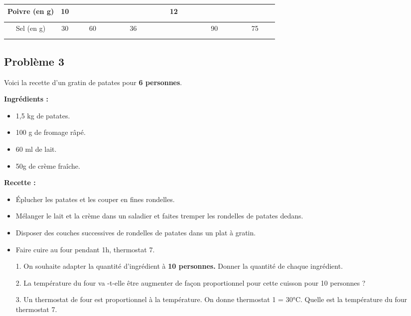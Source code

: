 \begin{center}\begin{tabular}{|c|c|c|c|c|c|c|} \hline
  Poivre (en g) & 10 &  $\phantom{\dfrac{azertyuiop}{O}}$  &   $\phantom{\dfrac{azertyuiop}{O}}$ & 12 &  $\phantom{\dfrac{azertyuiop}{O}}$  &  $\phantom{\dfrac{azertyuiop}{O}}$  \\  \hline
  Sel (en g)    & 30 & 60 & 36 &  $\phantom{\dfrac{azertyuiop}{O}}$  & 90 & 75 \\  \hline
\end{tabular}\end{center}

\Pointilles[5] 

\subsection*{Problème 3}

Voici la recette d'un gratin de patates pour \textbf{6 personnes}. 

\begin{minipage}[t]{0.45\textwidth}
  \textbf{Ingrédients : }
  \begin{itemize}
    \item 1,5 kg de patates.
    \item 100 g de fromage râpé.
    \item 60 ml de lait.
    \item 50g de crème fraîche.
  \end{itemize}

\end{minipage}
\begin{minipage}[t]{0.5\textwidth}
  \textbf{Recette :}
  \begin{itemize}
    \item Éplucher les patates et les couper en fines rondelles.
    \item Mélanger le lait et la crème dans un saladier et faites tremper les rondelles de patates dedans.
    \item Disposer des couches successives de rondelles de patates dans un plat à gratin. 
    \item Faire cuire au four pendant 1h, thermostat 7.
  \end{itemize}
\end{minipage}

\begin{enumerate}
  \item[1.] On souhaite adapter la quantité d'ingrédient à \textbf{10 personnes.} Donner la quantité de chaque ingrédient. \\ \Pointilles[7] 
  \item[2.] La température du four va -t-elle être augmenter de façon proportionnel pour cette cuisson pour 10 personnes ?  \\ \Pointilles[2] 
  \item[3.] Un thermostat de four est proportionnel à la température. On donne thermostat 1 = 30°C. Quelle est la température du four thermostat 7. \\ \Pointilles[3] 
\end{enumerate}


